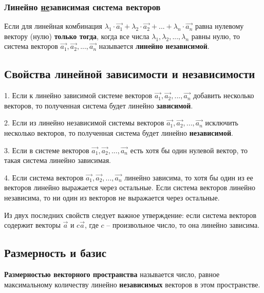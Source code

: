 \documentclass[12pt, fleqn]{extarticle}
\begin{document}
\subsubsection*{Линейно \underline{не}зависимая система векторов}
Если для линейная комбинация \(\lambda_1 \cdot \overrightarrow{a_1} + \lambda_2 \cdot \overrightarrow{a_2} + ... + \lambda_n \cdot \overrightarrow{a_n}\) равна нулевому вектору (нулю) \textbf{только тогда}, когда все числа \(\lambda_1, \lambda_2, ..., \lambda_n\) равны нулю, то система векторов \(\overrightarrow{a_1}, \overrightarrow{a_2}, ..., \overrightarrow{a_n}\) называется \textbf{линейно независимой}.

\subsection*{Свойства линейной зависимости и независимости}

1. Если к линейно зависимой системе векторов \(\overrightarrow{a_1}, \overrightarrow{a_2}, ..., \overrightarrow{a_n}\) добавить несколько векторов, то полученная система будет линейно \textbf{зависимой}.

2. Если из линейно независимой системы векторов \(\overrightarrow{a_1}, \overrightarrow{a_2}, ..., \overrightarrow{a_n}\) исключить несколько векторов, то полученная система будет линейно \textbf{независимой}.

3. Если в системе векторов \(\overrightarrow{a_1}, \overrightarrow{a_2}, ..., \overrightarrow{a_n}\) есть хотя бы один нулевой вектор, то такая система линейно зависимая.

4. Если система векторов \(\overrightarrow{a_1}, \overrightarrow{a_2}, ..., \overrightarrow{a_n}\) линейно зависима, то хотя бы один из ее векторов линейно выражается через остальные. Если система векторов линейно независима, то ни один из векторов не выражается через остальные.

Из двух последних свойств следует важное утверждение:
если система векторов содержит векторы \(\overrightarrow{a}\) и \(c \overrightarrow{a}\), где \(c\) – произвольное число, то она линейно зависима.

\subsection*{Размерность и базис}
\textbf{Размерностью векторного пространства} называется число, равное максимальному количеству линейно \textbf{независимых} векторов в этом пространстве.
\end{document}
